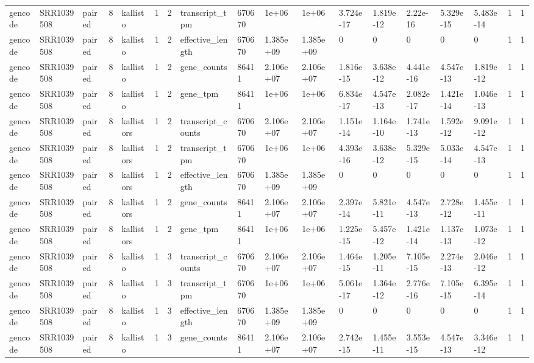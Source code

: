 \begin{tabular}{llllllllllllllllll}
gencode & SRR1039508 & paired & 8 & kallisto & 1 & 2 & transcript\_tpm & 670670 & 1e+06 & 1e+06 & 3.724e-17 & 1.819e-12 & 2.22e-16 & 5.329e-15 & 5.483e-14 & 1 & 1 \\
gencode & SRR1039508 & paired & 8 & kallisto & 1 & 2 & effective\_length & 670670 & 1.385e+09 & 1.385e+09 & 0 & 0 & 0 & 0 & 0 & 1 & 1 \\
gencode & SRR1039508 & paired & 8 & kallisto & 1 & 2 & gene\_counts & 86411 & 2.106e+07 & 2.106e+07 & 1.816e-15 & 3.638e-12 & 4.441e-16 & 4.547e-13 & 1.819e-12 & 1 & 1 \\
gencode & SRR1039508 & paired & 8 & kallisto & 1 & 2 & gene\_tpm & 86411 & 1e+06 & 1e+06 & 6.834e-17 & 4.547e-13 & 2.082e-17 & 1.421e-14 & 1.046e-13 & 1 & 1 \\
gencode & SRR1039508 & paired & 8 & kallistors & 1 & 2 & transcript\_counts & 670670 & 2.106e+07 & 2.106e+07 & 1.151e-14 & 1.164e-10 & 1.741e-13 & 1.592e-12 & 9.091e-12 & 1 & 1 \\
gencode & SRR1039508 & paired & 8 & kallistors & 1 & 2 & transcript\_tpm & 670670 & 1e+06 & 1e+06 & 4.393e-16 & 3.638e-12 & 5.329e-15 & 5.033e-14 & 4.547e-13 & 1 & 1 \\
gencode & SRR1039508 & paired & 8 & kallistors & 1 & 2 & effective\_length & 670670 & 1.385e+09 & 1.385e+09 & 0 & 0 & 0 & 0 & 0 & 1 & 1 \\
gencode & SRR1039508 & paired & 8 & kallistors & 1 & 2 & gene\_counts & 86411 & 2.106e+07 & 2.106e+07 & 2.397e-14 & 5.821e-11 & 4.547e-13 & 2.728e-12 & 1.455e-11 & 1 & 1 \\
gencode & SRR1039508 & paired & 8 & kallistors & 1 & 2 & gene\_tpm & 86411 & 1e+06 & 1e+06 & 1.225e-15 & 5.457e-12 & 1.421e-14 & 1.137e-13 & 1.073e-12 & 1 & 1 \\
gencode & SRR1039508 & paired & 8 & kallisto & 1 & 3 & transcript\_counts & 670670 & 2.106e+07 & 2.106e+07 & 1.464e-15 & 1.205e-11 & 7.105e-15 & 2.274e-13 & 2.046e-12 & 1 & 1 \\
gencode & SRR1039508 & paired & 8 & kallisto & 1 & 3 & transcript\_tpm & 670670 & 1e+06 & 1e+06 & 5.061e-17 & 1.364e-12 & 2.776e-16 & 7.105e-15 & 6.395e-14 & 1 & 1 \\
gencode & SRR1039508 & paired & 8 & kallisto & 1 & 3 & effective\_length & 670670 & 1.385e+09 & 1.385e+09 & 0 & 0 & 0 & 0 & 0 & 1 & 1 \\
gencode & SRR1039508 & paired & 8 & kallisto & 1 & 3 & gene\_counts & 86411 & 2.106e+07 & 2.106e+07 & 2.742e-15 & 1.455e-11 & 3.553e-15 & 4.547e-13 & 3.346e-12 & 1 & 1 \\

\end{tabular}

